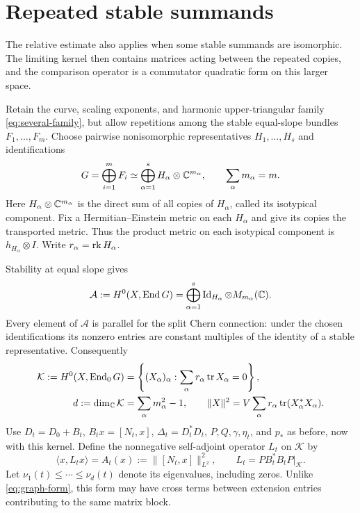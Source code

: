 \section{Repeated stable summands}\label{sec:repeated}

The relative estimate also applies when some stable summands are
isomorphic. The limiting kernel then contains matrices acting between
the repeated copies, and the comparison operator is a commutator
quadratic form on this larger space.

Retain the curve, scaling exponents, and harmonic upper-triangular family
\eqref{eq:several-family}, but allow repetitions among the stable
equal-slope bundles $F_1,\ldots,F_m$. Choose pairwise nonisomorphic
representatives $H_1,\ldots,H_s$ and identifications
\begin{equation}\label{eq:isotypical-splitting}
 G=\bigoplus_{i=1}^m F_i
   \simeq\bigoplus_{\alpha=1}^s H_\alpha\otimes\mathbb C^{m_\alpha},
 \qquad \sum_\alpha m_\alpha=m.
\end{equation}
Here $H_\alpha\otimes\mathbb C^{m_\alpha}$ is the direct sum of all copies
of $H_\alpha$, called its isotypical component. Fix a
Hermitian--Einstein metric on each $H_\alpha$ and give its copies the
transported metric. Thus the product metric on each isotypical
component is $h_{H_\alpha}\otimes I$. Write
$r_\alpha=\operatorname{rk} H_\alpha$.

Stability at equal slope gives
\begin{equation}\label{eq:matrix-algebra}
 \mathcal A:=H^0(X,\operatorname{End} G)
 =\bigoplus_{\alpha=1}^s
   \operatorname{Id}_{H_\alpha}\otimes M_{m_\alpha}(\mathbb C).
\end{equation}
Every element of $\mathcal A$ is parallel for the split Chern
connection: under the chosen identifications its nonzero entries
are constant multiples of the identity of a stable representative.
Consequently
\begin{equation}\label{eq:matrix-kernel}
 \begin{split}
 \mathcal K:=H^0(X,\operatorname{End}_0G)
 &=\left\{(X_\alpha)_\alpha:
             \sum_\alpha r_\alpha\operatorname{tr} X_\alpha=0\right\},\\
 d:=\dim_\mathbb C\mathcal K&=\sum_\alpha m_\alpha^2-1,\qquad
 \lVert X\rVert^2=V\sum_\alpha r_\alpha\operatorname{tr}(X_\alpha^*X_\alpha).
 \end{split}
\end{equation}
Use $D_t=D_0+B_t$, $B_tx=[N_t,x]$, $\Delta_t=D_t^*D_t$,
$P,Q,\gamma,\eta_t$, and $p_*$ as before, now with this kernel.
Define the nonnegative self-adjoint operator $L_t$ on $\mathcal K$ by
\begin{equation}\label{eq:matrix-form}
 \langle x,L_tx\rangle=A_t(x):=\lVert[N_t,x]\rVert_{L^2}^2,
 \qquad L_t=PB_t^*B_tP|_{\mathcal K}.
\end{equation}
Let $\nu_1(t)\le\cdots\le\nu_d(t)$ denote its eigenvalues, including
zeros. Unlike \eqref{eq:graph-form}, this form may have cross terms
between extension entries contributing to the same matrix block.

